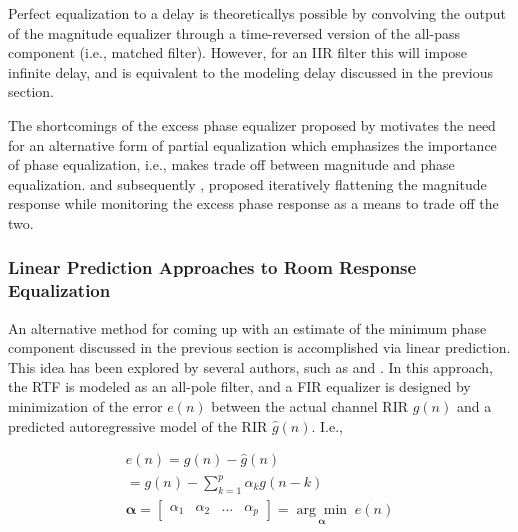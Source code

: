 Perfect equalization to a delay is theoreticallys possible by convolving the output of the magnitude equalizer through a time-reversed version of the all-pass component (i.e., matched filter). However, for an IIR filter this will impose infinite delay, and is equivalent to the modeling delay discussed in the previous section.

The shortcomings of the excess phase equalizer proposed by \cite{neely1979invertibility} motivates the need for an alternative form of partial equalization which emphasizes the importance of phase equalization, i.e., makes trade off between magnitude and phase equalization. \cite{radlovic2000nonminimum} and subsequently \cite{maamar2006partial}, proposed iteratively flattening the magnitude response while monitoring the excess phase response as a means to trade off the two.

\subsubsection{Linear Prediction Approaches to Room Response Equalization}

An alternative method for coming up with an estimate of the minimum phase component discussed in the previous section is accomplished via linear prediction. This idea has been explored by several authors, such as \cite{mourjopoulos1991pole} and \cite{haneda1997multiple}. In this approach, the RTF is modeled as an all-pole filter, and a FIR equalizer is designed by minimization of the error $e(n)$ between the actual channel RIR $g(n)$ and a predicted autoregressive model of the RIR $\hat{g}(n)$. I.e.,

\begin{eqnarray}
	e(n)= g(n) - \hat{g}(n) \\
	=  g(n) - \sum_{k=1}^{p}\alpha_k g(n-k) \\
	\boldsymbol{\alpha}=\begin{bmatrix} \alpha_1 & \alpha_2 & \dots & \alpha_p \end{bmatrix} = \underset{\boldsymbol{\alpha}}{\arg\min}\;e(n)
\end{eqnarray}

